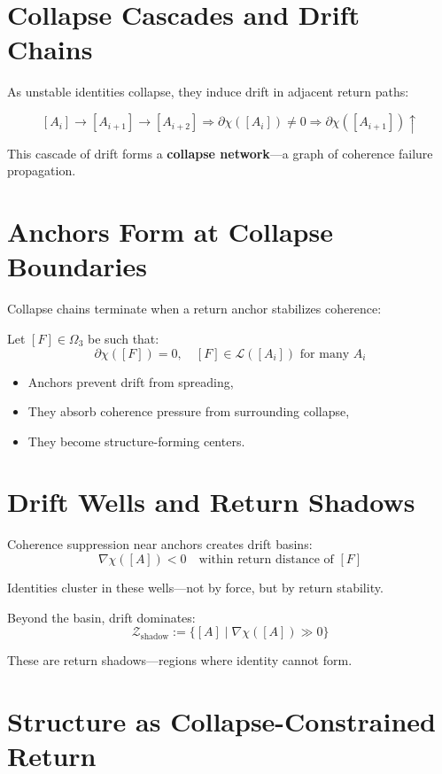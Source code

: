 \section{Collapse Cascades and Drift Chains} \label{sec:collapse-cascade}

As unstable identities collapse, they induce drift in adjacent return paths:

\[
[A_i] \to [A_{i+1}] \to [A_{i+2}] \Rightarrow \partial\chi([A_i]) \ne 0
\Rightarrow \partial\chi([A_{i+1}]) \uparrow
\]

This cascade of drift forms a \textbf{collapse network}—a graph of coherence failure propagation.

\section{Anchors Form at Collapse Boundaries} \label{sec:anchor-formation}

Collapse chains terminate when a return anchor stabilizes coherence:

Let $[F] \in \Omega_3$ be such that:
\[
\partial\chi([F]) = 0,\quad [F] \in \mathcal{L}([A_i]) \text{ for many } A_i
\]

\begin{itemize}
  \item Anchors prevent drift from spreading,
  \item They absorb coherence pressure from surrounding collapse,
  \item They become structure-forming centers.
\end{itemize}

\section{Drift Wells and Return Shadows} \label{sec:drift-wells}

Coherence suppression near anchors creates drift basins:
\[
\nabla\chi([A]) < 0 \quad \text{within return distance of } [F]
\]

Identities cluster in these wells—not by force, but by return stability.

Beyond the basin, drift dominates:
\[
\mathcal{Z}_{\text{shadow}} := \{ [A] \mid \nabla\chi([A]) \gg 0 \}
\]

These are return shadows—regions where identity cannot form.

\section{Structure as Collapse-Constrained Return} \label{sec:structure-birth}

